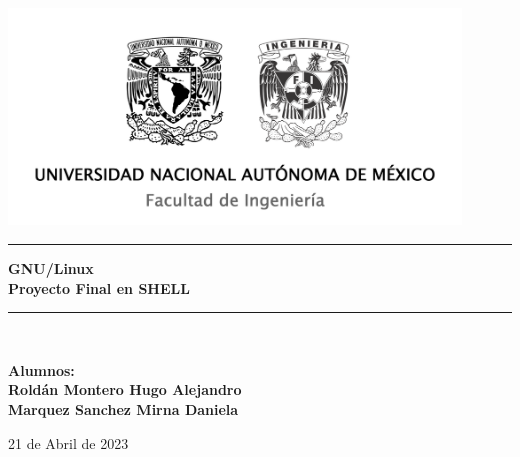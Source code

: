 

\begin{titlepage}

\newcommand{\linea}{\rule{\linewidth}{0.7mm}}                 
\center

\includegraphics[width=0.9\textwidth]{logos.png}\\[0.02cm]
\vfill

\linea
\vfill
\textbf{\Large GNU/Linux}\\[0.2cm]
\textbf{\Large Proyecto Final en SHELL}\\[0.8cm]
\linea \\
\vfill

\textbf{\large Alumnos:}\\

    \vfill
    \textbf{\large  \textbf{Roldán Montero Hugo Alejandro}}\\
    \textbf{\large  \textbf{Marquez Sanchez Mirna Daniela}}\\
    \vfill
    
    {\large 21 de Abril de 2023}\\
    \newpage
    \end{titlepage}

